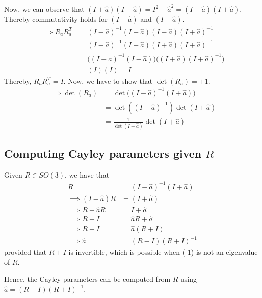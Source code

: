 Now, we can observe that \( (I + \hat{a}) (I - \hat{a}) = I^2 - \hat{a}^2 = (I - \hat{a}) (I + \hat{a}) \).\\
Thereby commutativity holds for \( (I - \hat{a}) \) and \( (I + \hat{a}) \).
\begin{align*}
    \implies
    R_a R_a^T
     & =
    (I - \hat{a})^{-1} (I + \hat{a}) (I - \hat{a}) (I + \hat{a})^{-1}
    \\ & =
    (I - \hat{a})^{-1} (I - \hat{a}) (I + \hat{a}) (I + \hat{a})^{-1}
    \\ & =
    \Big((I - \hat{a})^{-1} (I - \hat{a}) \Big) \Big( (I + \hat{a}) (I + \hat{a})^{-1} \Big)
    \\ & =
    (I)(I)
    = I
\end{align*}
Thereby, \( R_a R_a^T = I \).
Now, we have to show that \( \det(R_a) = +1 \).
\begin{align*}
    \implies
    \det(R_a)
     & = \det \Big( (I - \hat{a})^{-1} (I + \hat{a}) \Big)
    \\ & = \det \left( (I - \hat{a})^{-1} \right) \det (I + \hat{a})
    \\ & = \frac{1}{\det(I - \hat{a})} \det(I + \hat{a})
\end{align*}

\subsection*{Computing Cayley parameters given \( R \) }

Given \( R \in SO(3) \), we have that
\begin{align*}
    R
     & =
    (I - \hat{a})^{-1} (I + \hat{a})
    \\
    \implies
    (I - \hat{a}) R
     & =
    (I + \hat{a})
    \\
    \implies
    R - \hat{a} R
     & =
    I + \hat{a}
    \\
    \implies
    R - I
     & =
    \hat{a} R + \hat{a}
    \\
    \implies
    R - I
     & =
    \hat{a} (R + I)
    \\
    \implies
    \hat{a}
     & =
    (R - I)(R + I)^{-1}
\end{align*}
provided that \( R + I \) is invertible, which is possible when (-1) is not an eigenvalue of \( R \).

Hence, the Cayley parameters can be computed from \( R \) using \( \boxed{ \hat{a} = (R - I)(R + I)^{-1} } \).
